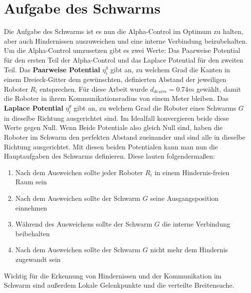 \section{Aufgabe des Schwarms}

Die Aufgabe des Schwarms ist es nun die Alpha-Control im Optimum zu halten, aber auch 
Hindernissen auszuweichen und eine interne Verbindung beizubehalten. Um die Alpha-Control umzusetzen 
gibt es zwei Werte: Das Paarweise Potential für den ersten Teil der Alpha-Control und das Laplace 
Potential für den zweiten Teil. Das \textbf{Paarweise Potential} $\eta_i^q$ gibt an, zu welchem Grad die Kanten 
in einem Dreieck-Gitter dem gewünschten, definierten Abstand der jeweiligen Roboter $R_i$ entsprechen. 
Für diese Arbeit wurde $d_{desire}=0.74m$ gewählt, damit die Roboter in ihrem Kommunikationsradius 
von einem Meter bleiben. Das \textbf{Laplace Potential} $\eta_i^\theta$ gibt an, zu welchem Grad die Roboter 
eines Schwarms $G$ in dieselbe Richtung ausgerichtet sind. Im Idealfall konvergieren beide diese Werte 
gegen Null. Wenn Beide Potentiale also gleich Null sind,
haben die Roboter im Schwarm den perfekten Abstand zueinander und sind alle in dieselbe Richtung
ausgerichtet. Mit diesen beiden Potentialen kann man nun die Hauptaufgaben des Schwarms 
definieren. Diese lauten folgendermaßen:

\begin{enumerate}
    \item Nach dem Ausweichen sollte jeder Roboter $R_i$ in einem Hindernis-freien Raum sein
    \item Nach dem Ausweichen sollte der Schwarm $G$ seine Ausgangsposition einnehmen
    \item Während des Ausweichens sollte der Schwarm $G$ die interne Verbindung beibehalten
    \item Nach dem Ausweichen sollte der Schwarm $G$ nicht mehr dem Hindernis zugewandt sein
\end{enumerate}

Wichtig für die Erkennung von Hindernissen und der Kommunikation im Schwarm sind außerdem Lokale 
Gelenkpunkte und die verteilte Breitensuche.